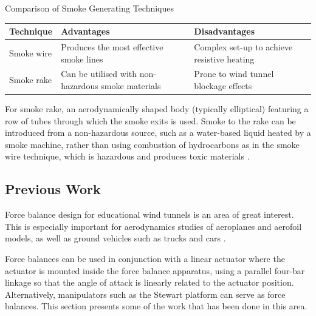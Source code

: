 \begin{center}
	\begin{table}[H]
		\caption[Smoke Generating Techniques]{Comparison of Smoke Generating Techniques}
	\end{table}
	\begin{tabular}{|p{5cm}|p{5cm}|p{5cm}|}
		\hline
		\textbf{Technique} & \textbf{Advantages}                                & \textbf{Disadvantages}                      \\
		\hline
		Smoke wire         & Produces the most effective smoke lines            & Complex set-up to achieve resistive heating \\
		\hline
		Smoke rake         & Can be utilised with non-hazardous smoke materials & Prone to wind tunnel blockage effects       \\
		\hline
	\end{tabular}
\end{center}
For smoke rake, an aerodynamically shaped
body (typically elliptical) featuring a row of tubes through which the smoke exits is used. Smoke to the rake can be introduced from a non-hazardous source,
such as a water-based liquid heated by a
smoke machine, rather than using combustion of hydrocarbons as in the smoke wire technique, which is hazardous and produces toxic materials \cite{trinder2013development}.

\subsection{Previous Work}
Force balance design for educational wind tunnels is an area of great interest. This is especially important
for aerodynamics studies of aeroplanes and aerofoil models, as well as ground vehicles such as trucks
and cars \cite{morris_force_2010}.

Force balances can be used in conjunction with a linear actuator where the
actuator is mounted inside the force balance apparatus, using a parallel four-bar linkage so that
the angle of attack is linearly related to the actuator position. Alternatively, manipulators such as the Stewart platform can serve as force balances. This section presents some of the work that has been done in this area.
